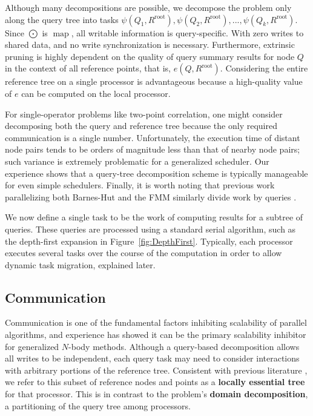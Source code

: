 \documentclass[twoside,leqno,twocolumn]{article}
\DeclareMathOperator*{\map}{map}
\newcommand{\fig}[1]{Figure~\ref{fig:#1}}
\newcommand{\gnp}{\psi}
\newcommand{\defterm}[1]{{\bf #1}}
\newcommand{\kdroot}[1]{#1^{\text{root}}}
\newcommand{\lettermu}{e}
\newcommand{\inmu}{e}
\begin{document}
Although many decompositions are possible, we decompose the problem only along the query tree into tasks $\gnp(Q_1, \kdroot{R}), \gnp(Q_2, \kdroot{R}), ..., \gnp(Q_k, \kdroot{R})$.
Since $\bigodot$ is $\map$, all writable information is query-specific.
With zero writes to shared data, and no write synchronization is necessary.
Furthermore, extrinsic pruning is highly dependent on the quality of query summary results for node $Q$ in the context of all reference points, that is, $\inmu(Q, \kdroot{R})$.
Considering the entire reference tree on a single processor is advantageous because a high-quality value of $\lettermu$ can be computed on the local processor.

For single-operator problems like two-point correlation, one might consider decomposing both the query and reference tree because the only required communication is a single number.
Unfortunately, the execution time of distant node pairs tends to be orders of magnitude less than that of nearby node pairs; such variance is extremely problematic for a generalized scheduler.
Our experience shows that a query-tree decomposition scheme is typically manageable for even simple schedulers.
Finally, it is worth noting that previous work parallelizing both Barnes-Hut and the FMM similarly divide work by queries \cite{liu94experiences, salmon_thesis, singh_thesis}.

We now define a single task to be the work of computing results for a subtree of queries.
These queries are processed using a standard serial algorithm, such as the depth-first expansion in \fig{DepthFirst}.
Typically, each processor executes several tasks over the course of the computation in order to allow dynamic task migration, explained later.

\subsection{Communication}

Communication is one of the fundamental factors inhibiting scalability of parallel algorithms, and experience has showed it can be the primary scalability inhibitor for generalized $N$-body methods.
Although a query-based decomposition allows all writes to be independent, each query task may need to consider interactions with arbitrary portions of the reference tree.
Consistent with previous literature \cite{salmon_thesis, singh_thesis}, we refer to this subset of reference nodes and points as a \defterm{locally essential tree} for that processor.
This is in contrast to the problem's \defterm{domain decomposition}, a partitioning of the query tree among processors.
\end{document}
